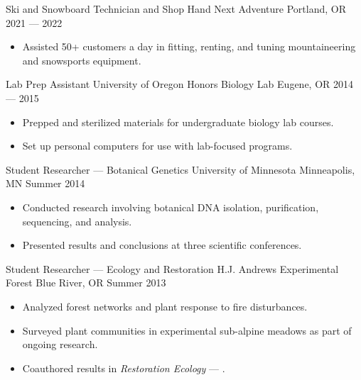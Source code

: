 \showoff
{Ski and Snowboard Technician and Shop Hand}
{Next Adventure}
{Portland, OR}
{2021 --- 2022}
\begin{itemize}
    \item Assisted 50+ customers a day in fitting, renting, and tuning mountaineering and snowsports equipment.
\end{itemize}

\myBreak

\showoff
{Lab Prep Assistant}
{University of Oregon Honors Biology Lab}
{Eugene, OR}
{2014 --- 2015}
\begin{itemize}
    \item Prepped and sterilized materials for undergraduate biology lab courses.
    \item Set up personal computers for use with lab-focused programs.
\end{itemize}

\myBreak

\showoff
{Student Researcher --- Botanical Genetics}
{University of Minnesota}
{Minneapolis, MN}
{Summer 2014}
\begin{itemize}
    \item Conducted research involving botanical DNA isolation, purification, sequencing, and analysis.
    \item Presented results and conclusions at three scientific conferences.
\end{itemize}

\myBreak

\showoff
{Student Researcher --- Ecology and Restoration}
{H.J. Andrews Experimental Forest}
{Blue River, OR}
{Summer 2013}
\begin{itemize}
    \item Analyzed forest networks and plant response to fire disturbances.
    \item Surveyed plant communities in experimental sub-alpine meadows as part of ongoing research.
    \item Coauthored results in \emph{Restoration Ecology} --- .
\end{itemize}

